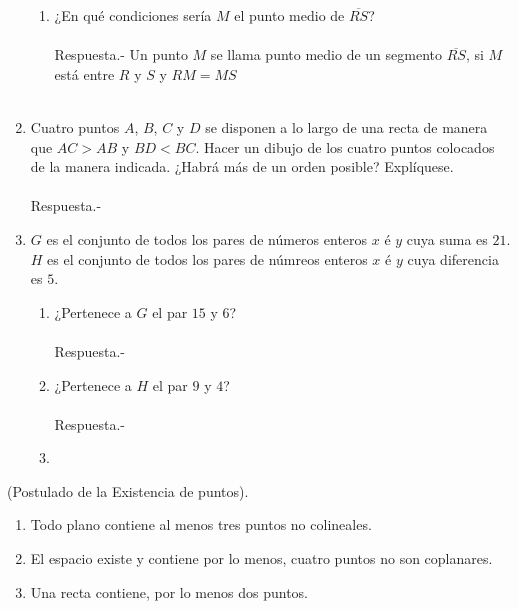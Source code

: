\begin{enumerate}
\begin{enumerate}[\bfseries (a)]
\item ¿En qué condiciones sería $M$ el punto medio de $\overline{RS}$?\\\\
Respuesta.- \; Un punto $M$ se llama punto medio de un segmento $\overline{RS}$, si $M$ está entre $R$ y $S$ y $RM=MS$\\\\
\end{enumerate}

\item Cuatro puntos $A$, $B$, $C$ y $D$ se disponen a lo largo de una recta de manera que $AC>AB$ y $BD<BC$. Hacer un dibujo de los cuatro puntos colocados de la manera indicada. ¿Habrá más de un orden posible? Explíquese.\\\\
Respuesta.- \; 

\item $G$ es el conjunto de todos los pares de números enteros $x$ é $y$ cuya suma es $21$. $H$ es el conjunto de todos los pares de númreos enteros $x$ é $y$ cuya diferencia es $5$.
\begin{enumerate}[\bfseries (a)]
\item ¿Pertenece a $G$ el par $15$ y $6$?\\\\
Respuesta.- \; 

\item ¿Pertenece a $H$ el par $9$ y $4$?\\\\
Respuesta.- \; 

\item 
\end{enumerate}
\end{enumerate}






\begin{tcolorbox}[colback=black!9!,colframe=white]
\begin{post}(Postulado de la Existencia de puntos).
\begin{enumerate}[\bfseries a)]
\item Todo plano contiene al menos tres puntos no colineales.
\item El espacio existe y contiene por lo menos, cuatro puntos no son coplanares.
\item Una recta contiene, por lo menos dos puntos.
\end{enumerate}
\end{post}
\end{tcolorbox}

